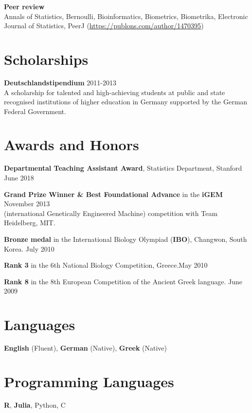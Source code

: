 \documentclass[margin,line]{res}
\newcommand{\ver}{\vspace*{-2.7mm}}
\begin{document}
\begin{resume}
\textbf{Peer review}\\
Annals of Statistics, Bernoulli, Bioinformatics, Biometrics, Biometrika, Electronic Journal of Statistics, PeerJ (\url{https://publons.com/author/1470395})


\section{\sc Scholarships}


\textbf{Deutschlandstipendium} \hfill 2011-2013\\
A scholarship for talented and high-achieving students at public and state recognised institutions of higher education in Germany supported by the German Federal Government.


\section{\sc Awards and Honors}
\textbf{Departmental Teaching Assistant Award}, Statistics Department, Stanford \hfill June 2018

\textbf{Grand Prize Winner \& Best Foundational Advance} in the \textbf{iGEM} \hfill November 2013 \\
(international Genetically Engineered Machine) competition with Team Heidelberg, MIT.

\ver
\textbf{Bronze medal} in the International Biology Olympiad (\textbf{IBO}), Changwon, South Korea. \hfill July 2010

\ver
\textbf{Rank 3} in the 6th National Biology Competition, Greece.\hfill May 2010
\ver

\textbf{Rank 8} in the 8th European Competition of the Ancient Greek language. \hfill June 2009




\section{\sc Languages}
\textbf{English} (Fluent), \textbf{German} (Native), \textbf{Greek} (Native)


\section{\sc Programming Languages}
\textbf{R}, \textbf{Julia}, Python, C



\end{resume}
\end{document}
